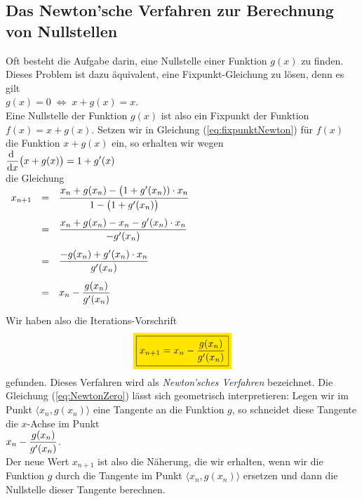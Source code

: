 \subsection{Das Newton'sche Verfahren zur Berechnung von Nullstellen}
Oft besteht die Aufgabe darin, eine Nullstelle einer Funktion $g(x)$ zu finden.
Dieses Problem ist dazu \"aquivalent, eine Fixpunkt-Gleichung zu l\"osen, denn es gilt
\\[0.2cm]
\hspace*{1.3cm}
$g(x) = 0 \;\Leftrightarrow\; x + g(x) = x$.
\\[0.2cm]
Eine Nullstelle der Funktion $g(x)$ ist also ein Fixpunkt der Funktion $f(x) = x + g(x)$.
Setzen wir in Gleichung (\ref{eq:fixpunktNewton}) f\"ur $f(x)$ die Funktion $x + g(x)$ ein,
so erhalten wir wegen
\\[0.2cm]
\hspace*{1.3cm}
$\displaystyle\frac{\textrm{d}\;}{\textrm{d}x} \bigl(x+g(x)\bigr) = 1 + g'(x)$
\\[0.2cm]
die Gleichung 
\\[0.2cm]
\hspace*{1.3cm}
$\begin{array}[t]{lcl}
 x_{n+1} & = & \displaystyle\frac{x_n + g(x_n) - \bigl(1 + g'(x_n)) \cdot  x_{n}}{1 - \bigl(1 + g'(x_n)\bigr)} \\[0.5cm]
        & = & \displaystyle\frac{x_n + g(x_n)  - x_{n} - g'(x_n)\cdot x_n}{-g'(x_n)} \\[0.5cm]
        & = & \displaystyle\frac{- g(x_n) + g'(x_n)\cdot x_n}{g'(x_n)} \\[0.5cm]
        & = & \displaystyle x_n - \frac{g(x_n)}{g'(x_n)} \\[0.5cm]
 \end{array}
$
\\[0.2cm]
Wir haben also  die Iterations-Vorschrift 
\begin{equation}
  \label{eq:NewtonZero}
  \colorbox{orange}{\framebox{$\ds x_{n+1} = x_n - \frac{g(x_n)}{g'(x_n)}$}} 
\end{equation}
gefunden.  Dieses Verfahren wird als  \emph{Newton'sches Verfahren} bezeichnet.
Die Gleichung  (\ref{eq:NewtonZero}) l\"asst sich geometrisch interpretieren: Legen wir im Punkt
$\langle x_n, g(x_n) \rangle$ eine Tangente an die Funktion $g$, so schneidet diese Tangente die
$x$-Achse im Punkt 
\\[0.2cm]
\hspace*{1.3cm}
$\displaystyle x_n - \frac{g(x_n)}{g'(x_n)}$.
\\[0.2cm]
Der neue Wert $x_{n+1}$ ist also die N\"aherung, die wir erhalten, wenn wir die Funktion $g$ durch die
Tangente im Punkt $\langle x_n, g(x_n) \rangle$ ersetzen und dann die Nullstelle  dieser
Tangente berechnen.

